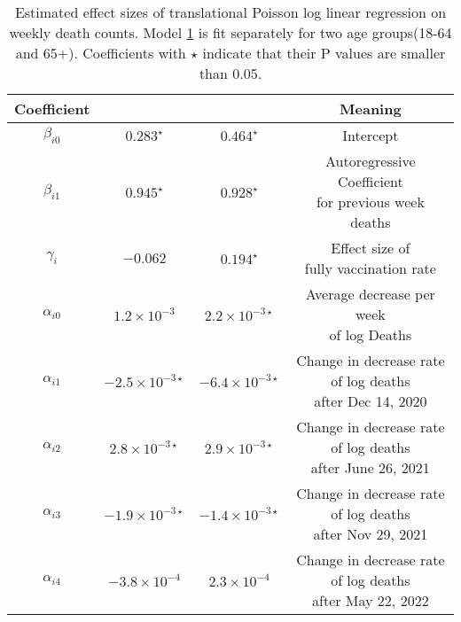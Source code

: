 \documentclass[12pt]{article}
\begin{document}
\begin{enumerate}[(a)]
\begin{table}[htbp]
		\centering
		\begin{tabular}{cccc}
			\toprule
			Coefficient & \makecell{18-64 Age Group($i=0$)} & \makecell{65+ Age Group($i=1$)} &  Meaning\\
			\midrule
			$\beta_{i0}$ & $0.283^\star$ & $0.464^\star$ & Intercept\\
			\addlinespace[0.2cm]
			$\beta_{i1}$ & $0.945^\star$ & $0.928^\star$ &  \makecell{Autoregressive Coefficient \\ for previous week deaths}\\
			\addlinespace[0.2cm]
			$\gamma_{i}$ & $-0.062$ & $0.194^\star$ &  \makecell{Effect size of \\fully vaccination rate}\\
			\addlinespace[0.2cm] 
			$\alpha_{i0}$ & $1.2\times 10^{-3}$ & $2.2\times 10^{-3\star}$ &   \makecell{Average decrease per week \\ of log Deaths}\\
			\addlinespace[0.2cm]
			$\alpha_{i1}$ & $-2.5\times 10^{-3\star}$ & $-6.4\times 10^{-3\star}$ &  \makecell{Change in decrease rate \\ of log deaths\\ after Dec 14, 2020}\\
			\addlinespace[0.2cm]
			$\alpha_{i2}$ & $2.8\times 10^{-3\star}$ & $2.9\times 10^{-3\star}$ &  \makecell{Change in decrease rate \\ of log deaths\\ after June 26, 2021}\\
			\addlinespace[0.2cm]
			$\alpha_{i3}$ & $-1.9\times 10^{-3\star}$ & $-1.4\times 10^{-3\star}$ & \makecell{Change in decrease rate \\ of log deaths\\ after Nov 29, 2021}\\
			\addlinespace[0.2cm]
			$\alpha_{i4}$ & $-3.8\times 10^{-4}$ & $2.3\times 10^{-4}$ &  \makecell{Change in decrease rate \\ of log deaths \\ after May 22, 2022}\\
			
			\bottomrule
		\end{tabular}
		\caption{Estimated effect sizes of translational Poisson log linear regression on weekly death counts. Model \ref{P3a} is fit separately for two age groups(18-64 and 65+). Coefficients with $\star$ indicate that their P values are smaller than 0.05. }\label{P3a}
\end{table}


\end{enumerate}
\end{document}
